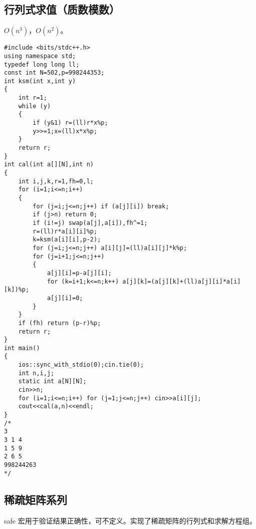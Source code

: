 \documentclass[12pt]{ctexart}
\begin{document}
\subsection{行列式求值（质数模数）}

$O(n^3)$，$O(n^2)$。

\begin{lstlisting}
#include <bits/stdc++.h>
using namespace std;
typedef long long ll;
const int N=502,p=998244353;
int ksm(int x,int y)
{
	int r=1;
	while (y)
	{
		if (y&1) r=(ll)r*x%p;
		y>>=1;x=(ll)x*x%p;
	}
	return r;
}
int cal(int a[][N],int n)
{
	int i,j,k,r=1,fh=0,l;
	for (i=1;i<=n;i++)
	{
		for (j=i;j<=n;j++) if (a[j][i]) break;
		if (j>n) return 0;
		if (i!=j) swap(a[j],a[i]),fh^=1;
		r=(ll)r*a[i][i]%p;
		k=ksm(a[i][i],p-2);
		for (j=i;j<=n;j++) a[i][j]=(ll)a[i][j]*k%p;
		for (j=i+1;j<=n;j++)
		{
			a[j][i]=p-a[j][i];
			for (k=i+1;k<=n;k++) a[j][k]=(a[j][k]+(ll)a[j][i]*a[i][k])%p;
			a[j][i]=0;
		}
	}
	if (fh) return (p-r)%p;
	return r;
}
int main()
{
	ios::sync_with_stdio(0);cin.tie(0);
	int n,i,j;
	static int a[N][N];
	cin>>n;
	for (i=1;i<=n;i++) for (j=1;j<=n;j++) cin>>a[i][j];
	cout<<cal(a,n)<<endl;
}
/*
3
3 1 4
1 5 9
2 6 5
998244263
*/
\end{lstlisting}

\subsection{稀疏矩阵系列}

safe 宏用于验证结果正确性，可不定义。实现了稀疏矩阵的行列式和求解方程组。
\end{document}

